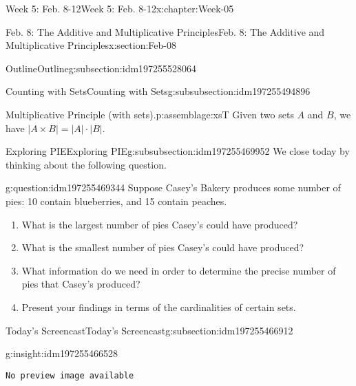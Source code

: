 \documentclass[oneside,10pt,]{book}
\newcommand{\mono}[1]{\texttt{#1}}
\numberwithin{equation}{section}
\newlength{\qrsize}
\newlength{\previewwidth}
\newcommand{\card}[1]{\left| #1 \right|}
\begin{document}
\begin{chapterptx}{Week 5: Feb. 8-12}{}{Week 5: Feb. 8-12}{}{}{x:chapter:Week-05}
\begin{sectionptx}{Feb. 8: The Additive and Multiplicative Principles}{}{Feb. 8: The Additive and Multiplicative Principles}{}{}{x:section:Feb-08}
\begin{subsectionptx}{Outline}{}{Outline}{}{}{g:subsection:idm197255528064}
\begin{subsubsectionptx}{Counting with Sets}{}{Counting with Sets}{}{}{g:subsubsection:idm197255494896}
\begin{assemblage}{Multiplicative Principle (with sets).}{p:assemblage:xsT}%
Given two sets \(A\) and \(B\), we have \(\card{A \times B} = \card{A} \cdot \card{B}\).%
\end{assemblage}
\end{subsubsectionptx}
%
%
\typeout{************************************************}
\typeout{************************************************}
%
\begin{subsubsectionptx}{Exploring PIE}{}{Exploring PIE}{}{}{g:subsubsection:idm197255469952}
We close today by thinking about the following question.%
\begin{question}{}{g:question:idm197255469344}%
Suppose Casey's Bakery produces some number of pies: 10 contain blueberries, and 15 contain peaches.%
%
\begin{enumerate}
\item{}What is the largest number of pies Casey's could have produced?%
\item{}What is the smallest number of pies Casey's could have produced?%
\item{}What information do we need in order to determine the precise number of pies that Casey's produced?%
\item{}Present your findings in terms of the cardinalities of certain sets.%
\end{enumerate}
\end{question}
\end{subsubsectionptx}
\end{subsectionptx}
%
%
\typeout{************************************************}
\typeout{************************************************}
%
\begin{subsectionptx}{Today's Screencast}{}{Today's Screencast}{}{}{g:subsection:idm197255466912}
\begin{insight}{}{g:insight:idm197255466528}%
\setlength{\qrsize}{9em}
\setlength{\previewwidth}{\linewidth}
\addtolength{\previewwidth}{-\qrsize}
\begin{tcbraster}[raster columns=2, raster column skip=1pt, raster halign=center, raster force size=false, raster left skip=0pt, raster right skip=0pt]%
\begin{tcolorbox}[previewstyle, width=\previewwidth]%
\mono{No preview image available}%
\end{tcolorbox}%
\begin{tcolorbox}[qrstyle]%

\end{tcolorbox}
\end{tcbraster}
\end{insight}
\end{subsectionptx}
\end{sectionptx}
\end{chapterptx}
\end{document}
